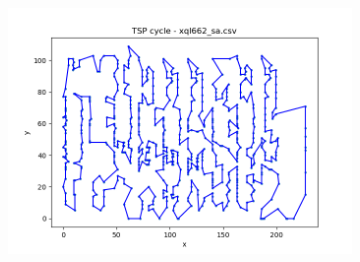 \documentclass[12pt]{article}
\begin{document}
\begin{figure}[htpb]
\begin{subfigure}[b]{0.475\textwidth}
                \includegraphics[width=\linewidth]{img/xql662_sa.png}
            \end{subfigure}
        \end{figure}
\end{document}
